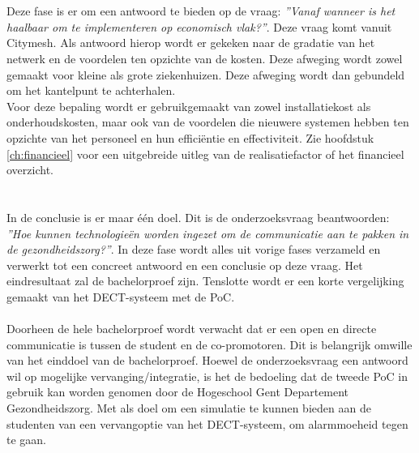 \section{}
\label{sec:realisation}
Deze fase is er om een antwoord te bieden op de vraag: \textit{''Vanaf wanneer is het haalbaar om te implementeren op economisch vlak?''}. Deze vraag komt vanuit Citymesh. Als antwoord hierop wordt er gekeken naar de gradatie van het netwerk en de voordelen ten opzichte van de kosten. Deze afweging wordt zowel gemaakt voor kleine als grote ziekenhuizen. Deze afweging wordt dan gebundeld om het kantelpunt te achterhalen. \\ Voor deze bepaling wordt er gebruikgemaakt van zowel installatiekost als onderhoudskosten, maar ook van de voordelen die nieuwere systemen hebben ten opzichte van het personeel en hun efficiëntie en effectiviteit. 
Zie hoofdstuk \ref{ch:financieel} voor een uitgebreide uitleg van de realisatiefactor of het financieel overzicht.

\section{}
\label{sec:conclusion}
In de conclusie is er maar één doel. Dit is de onderzoeksvraag beantwoorden: \textit{''Hoe kunnen technologieën worden ingezet om de communicatie aan te pakken in de gezondheidszorg?''}. In deze fase wordt alles uit vorige fases verzameld en verwerkt tot een concreet antwoord en een conclusie op deze vraag. Het eindresultaat zal de bachelorproef zijn. Tenslotte wordt er een korte vergelijking gemaakt van het DECT-systeem met de PoC.
\\\\
Doorheen de hele bachelorproef wordt verwacht dat er een open en directe communicatie is tussen de student en de co-promotoren. Dit is belangrijk omwille van het einddoel van de bachelorproef. Hoewel de onderzoeksvraag een antwoord wil op mogelijke vervanging/integratie, is het de bedoeling dat de tweede PoC in gebruik kan worden genomen door de Hogeschool Gent Departement Gezondheidszorg. Met als doel om een simulatie te kunnen bieden aan de studenten van een vervangoptie van het DECT-systeem, om alarmmoeheid tegen te gaan.

